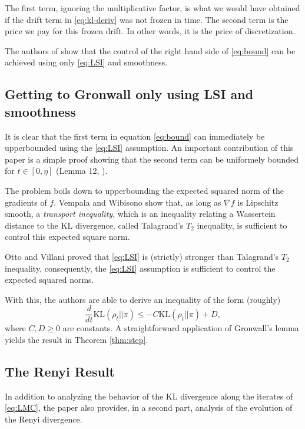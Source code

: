 \documentclass[11pt,twoside]{article}
\theoremstyle{definition}
\newcommand{\KL}{\text{KL}}
\begin{document}
The {\color{Fuchsia} first} term, ignoring the multiplicative factor, is what we would have obtained if the {\color{MidnightBlue}drift} term in \eqref{eq:kl-deriv} was not frozen in time. The {\color{Bittersweet} second} term is the price we pay for this frozen drift. In other words, it is the price of discretization.

The authors of \cite{vempala_rapid_2019} show that the control of the right hand side of \eqref{eq:bound} can be achieved using only \eqref{eq:LSI} and smoothness.

\subsection{Getting to Gronwall only using LSI and smoothness}

It is clear that the {\color{Fuchsia} first} term in equation \eqref{eq:bound} can immediately be upperbounded using the \eqref{eq:LSI} assumption. An important contribution of this paper is a simple proof showing that the {\color{Bittersweet} second} term can be uniformely bounded for $t \in [0, \eta]$ (Lemma 12, \cite{vempala_rapid_2019}).

The problem boils down to upperbounding the expected squared norm of the gradients of $f$. Vempala and Wibisono show that, as long as $\nabla f$ is Lipschitz smooth, a \textit{transport inequality}, which is an inequality relating a Wassertein distance to the KL divergence, called Talagrand's $T_2$ inequality, is sufficient to control this expected square norm. 

Otto and Villani proved that \eqref{eq:LSI} is (strictly) stronger than Talagrand's $T_2$ inequality, consequently, the \eqref{eq:LSI} assumption is sufficient to control the expected squared norms.

With this, the authors are able to derive an inequality of the form (roughly)
\[
\frac{d}{dt}\KL(\rho_t || \pi) \leq -C\KL(\rho_t || \pi) + D,
\]
where $C, D \geq 0$ are constants. A straightforward application of Gronwall's lemma yields the result in Theorem \ref{thm:step}.

\subsection{The Renyi Result}

In addition to analyzing the behavior of the $\KL$ divergence along the iterates of \eqref{eq:LMC}, the paper also provides, in a second part, analysis of the evolution of the Renyi divergence.
\end{document}
